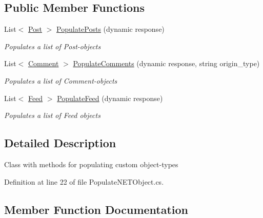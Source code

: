\subsection*{Public Member Functions}
\begin{DoxyCompactItemize}
\item 
List$<$ \hyperlink{class_data_1_1_facebook_objects_1_1_post}{Post} $>$ \hyperlink{class_operations_1_1_data_operations_1_1_populate_n_e_t_object_a780372790782b34a234524055c1afec5}{Populate\+Posts} (dynamic response)
\begin{DoxyCompactList}\small\item\em Populates a list of Post-\/objects \end{DoxyCompactList}\item 
List$<$ \hyperlink{class_data_1_1_facebook_objects_1_1_comment}{Comment} $>$ \hyperlink{class_operations_1_1_data_operations_1_1_populate_n_e_t_object_a6573ae438326c9fb036ba38af6cb0d16}{Populate\+Comments} (dynamic response, string origin\+\_\+type)
\begin{DoxyCompactList}\small\item\em Populates a list of Comment-\/objects \end{DoxyCompactList}\item 
List$<$ \hyperlink{class_data_1_1_facebook_objects_1_1_feed}{Feed} $>$ \hyperlink{class_operations_1_1_data_operations_1_1_populate_n_e_t_object_a31da696e614215afced22da40a5b3f20}{Populate\+Feed} (dynamic response)
\begin{DoxyCompactList}\small\item\em Populates a list of Feed objects \end{DoxyCompactList}\end{DoxyCompactItemize}


\subsection{Detailed Description}
Class with methods for populating custom object-\/types 



Definition at line 22 of file Populate\+N\+E\+T\+Object.\+cs.



\subsection{Member Function Documentation}
